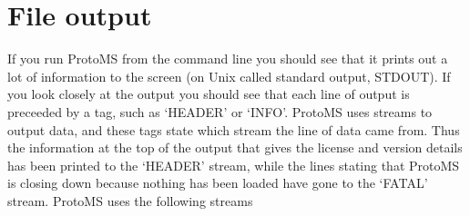 \documentclass[letterpaper,10pt,english]{sphinxmanual}
\begin{document}
\section{File output}
\label{protoms:file-output}\label{protoms:index-27}
If you run ProtoMS from the command line you should see that it prints out a lot of information to the screen (on Unix called standard output, STDOUT). If you look closely at the output you should see that each line of output is preceeded by a tag, such as ‘HEADER’ or ‘INFO’. ProtoMS uses streams to output data, and these tags state which stream the line of data came from. Thus the information at the top of the output that gives the license and version details has been printed to the ‘HEADER’ stream, while the lines stating that ProtoMS is closing down because nothing has been loaded have gone to the ‘FATAL’ stream. ProtoMS uses the following streams
\end{document}
